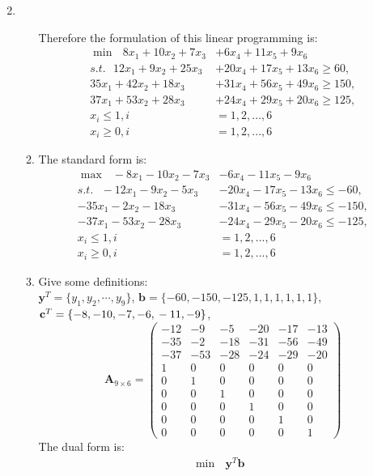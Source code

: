 \documentclass[12pt,a4paper]{article}
\makeatletter
\newtheorem*{solution}{Solution}
\theoremstyle{definition}
\renewenvironment{solution}[1][Solution] {\par\pushQED{\qed}\normalfont\topsep6\p@\@plus6\p@\relax\trivlist\item[\hskip\labelsep\bfseries#1\@addpunct{.}]\ignorespaces}{\popQED\endtrivlist\@endpefalse} \makeatother
\makeatother
\begin{document}
\begin{enumerate}
\begin{solution}
\begin{enumerate}
    		Therefore the formulation of this linear programming is:
    		\begin{align*}
    			\min \text{  }8x_1+10x_2+7x_3&+6x_4+11x_5+9x_6\\
    			s.t.\text{  }12x_1+9x_2+25x_3&+20x_4+17x_5+13x_6\ge 60,\\
    			35x_1+42x_2+18x_3&+31x_4+56x_5+49x_6\ge 150,\\
    			37x_1+53x_2+28x_3&+24x_4+29x_5+20x_6\ge 125,\\
    			x_i \le 1, i &= 1,2,...,6\\
    			x_i \ge 0, i &= 1,2,...,6
    		\end{align*}
    		\item The standard form is:
    		\begin{align*}
    		\max \text{  }-8x_1-10x_2-7x_3&-6x_4-11x_5-9x_6\\
    		s.t.\text{  }-12x_1-9x_2-5x_3&-20x_4-17x_5-13x_6\le -60,\\
    		-35x_1-2x_2-18x_3&-31x_4-56x_5-49x_6\le -150,\\
    		-37x_1-53x_2-28x_3&-24x_4-29x_5-20x_6\le -125,\\
    		x_i \le 1, i &= 1,2,...,6\\
    		x_i \ge 0, i &= 1,2,...,6
    		\end{align*}
    		\item Give some definitions:\\
    		$ \mathbf{y}^{T} = \{y_1,y_{2},\cdots,y_9\} $, $ \mathbf{b} = \{-60,-150,-125,1,1,1,1,1,1\} $, $ \mathbf{c}^{T} = \{-8,-10,-7,-6,\\-11,-9\} $, $ $
    		$$\mathbf{A}_{9\times 6} = \begin{pmatrix}
    			-12 & -9 & -5 & -20 & -17 & -13\\
    			-35 & -2 & -18 & -31 & -56 & -49\\
    			-37 & -53 & -28 & -24 & -29 & -20\\
    			1 & 0 & 0 & 0 & 0 & 0\\
    			0 & 1 & 0 & 0 & 0 & 0\\
    			0 & 0 & 1 & 0 & 0 & 0\\
    			0 & 0 & 0 & 1 & 0 & 0\\
    			0 & 0 & 0 & 0 & 1 & 0\\
    			0 & 0 & 0 & 0 & 0 & 1
    		\end{pmatrix}
    		$$
    		The dual form is:
    		\begin{align*}
    			\min \text{  } \mathbf{y}^{T}\mathbf{b}&\\

\end{align*}
\end{enumerate}
\end{solution}
\end{enumerate}
\end{document}
